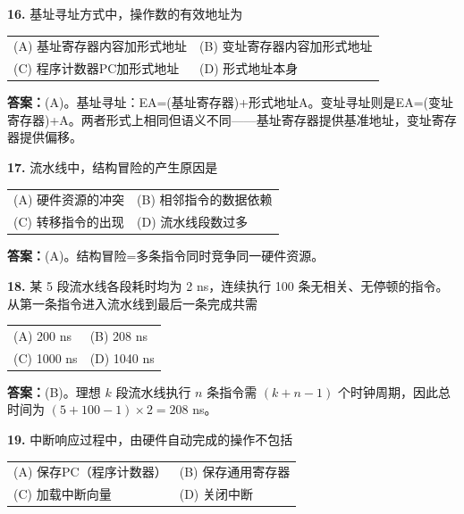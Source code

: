 \noindent\textbf{16.} 基址寻址方式中，操作数的有效地址为
\begin{center}
\begin{tabular}{ll}
(A) 基址寄存器内容加形式地址 & (B) 变址寄存器内容加形式地址 \\[6pt]
(C) 程序计数器PC加形式地址 & (D) 形式地址本身
\end{tabular}
\end{center}

\ifshowsolutions\par\noindent\textbf{答案：}(A)。基址寻址：EA=(基址寄存器)+形式地址A。变址寻址则是EA=(变址寄存器)+A。两者形式上相同但语义不同——基址寄存器提供基准地址，变址寄存器提供偏移。\else \answerarea \fi

\vspace{6pt}

\noindent\textbf{17.} 流水线中，结构冒险的产生原因是
\begin{center}
\begin{tabular}{ll}
(A) 硬件资源的冲突 & (B) 相邻指令的数据依赖 \\[6pt]
(C) 转移指令的出现 & (D) 流水线段数过多
\end{tabular}
\end{center}

\ifshowsolutions\par\noindent\textbf{答案：}(A)。结构冒险=多条指令同时竞争同一硬件资源。\else \answerarea \fi

\vspace{6pt}

\noindent\textbf{18.} 某 5 段流水线各段耗时均为 2 ns，连续执行 100 条无相关、无停顿的指令。从第一条指令进入流水线到最后一条完成共需
\begin{center}
\begin{tabular}{ll}
(A) 200 ns & (B) 208 ns \\[6pt]
(C) 1000 ns & (D) 1040 ns
\end{tabular}
\end{center}

\ifshowsolutions\par\noindent\textbf{答案：}(B)。理想 $k$ 段流水线执行 $n$ 条指令需 $(k+n-1)$ 个时钟周期，因此总时间为 $(5+100-1)\times2=208$ ns。\else \answerarea \fi

\vspace{6pt}

\noindent\textbf{19.} 中断响应过程中，由硬件自动完成的操作不包括
\begin{center}
\begin{tabular}{ll}
(A) 保存PC（程序计数器）& (B) 保存通用寄存器 \\[6pt]
(C) 加载中断向量 & (D) 关闭中断
\end{tabular}
\end{center}

